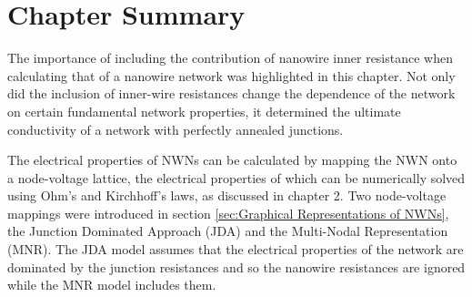 \section{Chapter Summary}
\label{sec:Conclusion}
The importance of including the contribution of nanowire inner resistance when calculating that of a nanowire network was highlighted in this chapter. Not only did the inclusion of inner-wire resistances change the dependence of the network on certain fundamental network properties, it determined the ultimate conductivity of a network with perfectly annealed junctions. 

The electrical properties of NWNs can be calculated by mapping the NWN onto a node-voltage lattice, the electrical properties of which can be numerically solved using Ohm's and Kirchhoff's laws, as discussed in chapter 2. Two node-voltage mappings were introduced in section \ref{sec:Graphical Representations of NWNs}, the Junction Dominated Approach (JDA) and the Multi-Nodal Representation (MNR). The JDA model assumes that the electrical properties of the network are dominated by the junction resistances and so the nanowire resistances are ignored while the MNR model includes them. 


